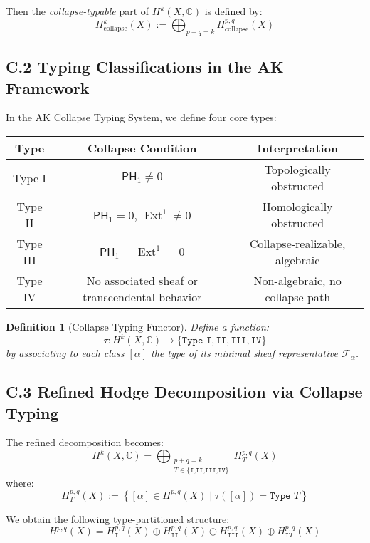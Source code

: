 \documentclass[11pt]{article}
\newtheorem{definition}[theorem]{Definition}
\DeclareMathOperator{\Ext}{Ext}
\begin{document}
Then the \emph{collapse-typable} part of $H^k(X, \mathbb{C})$ is defined by:
\[
H^k_{\text{collapse}}(X) := \bigoplus_{p+q=k} H^{p,q}_{\text{collapse}}(X)
\]

\subsection*{C.2 Typing Classifications in the AK Framework}

In the AK Collapse Typing System, we define four core types:

\begin{center}
\begin{tabular}{|c|c|c|}
\hline
\textbf{Type} & \textbf{Collapse Condition} & \textbf{Interpretation} \\
\hline
Type I & $\mathsf{PH}_1 \ne 0$ & Topologically obstructed \\
\hline
Type II & $\mathsf{PH}_1 = 0$, $\Ext^1 \ne 0$ & Homologically obstructed \\
\hline
Type III & $\mathsf{PH}_1 = \Ext^1 = 0$ & Collapse-realizable, algebraic \\
\hline
Type IV & No associated sheaf or transcendental behavior & Non-algebraic, no collapse path \\
\hline
\end{tabular}
\end{center}

\begin{definition}[Collapse Typing Functor]
Define a function:
\[
\tau: H^k(X, \mathbb{C}) \to \{ \texttt{Type I}, \texttt{II}, \texttt{III}, \texttt{IV} \}
\]
by associating to each class $[\alpha]$ the type of its minimal sheaf representative $\mathcal{F}_\alpha$.
\end{definition}

\subsection*{C.3 Refined Hodge Decomposition via Collapse Typing}

The refined decomposition becomes:
\[
H^k(X, \mathbb{C}) = \bigoplus_{\substack{p+q=k \\ T \in \{\texttt{I,II,III,IV}\}}} H^{p,q}_{T}(X)
\]
where:
\[
H^{p,q}_{T}(X) := \left\{ [\alpha] \in H^{p,q}(X) \mid \tau([\alpha]) = \texttt{Type } T \right\}
\]

We obtain the following type-partitioned structure:
\[
H^{p,q}(X) = H^{p,q}_{\texttt{I}}(X) \oplus H^{p,q}_{\texttt{II}}(X) \oplus H^{p,q}_{\texttt{III}}(X) \oplus H^{p,q}_{\texttt{IV}}(X)
\]
\end{document}
